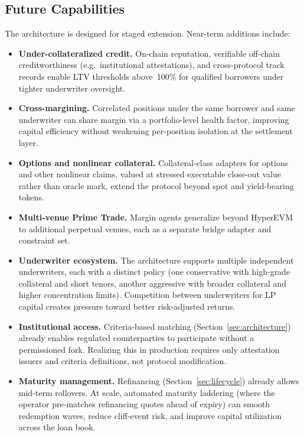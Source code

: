 \subsection{Future Capabilities}

The architecture is designed for staged extension. Near-term additions include:
\begin{itemize}
  \item \textbf{Under-collateralized credit.} On-chain reputation, verifiable off-chain creditworthiness (e.g.\ institutional attestations), and cross-protocol track records enable LTV thresholds above~100\% for qualified borrowers under tighter underwriter oversight.
  \item \textbf{Cross-margining.} Correlated positions under the same borrower and same underwriter can share margin via a portfolio-level health factor, improving capital efficiency without weakening per-position isolation at the settlement layer.
  \item \textbf{Options and nonlinear collateral.} Collateral-class adapters for options and other nonlinear claims, valued at stressed executable close-out value rather than oracle mark, extend the protocol beyond spot and yield-bearing tokens.
  \item \textbf{Multi-venue Prime Trade.} Margin agents generalize beyond HyperEVM to additional perpetual venues, each as a separate bridge adapter and constraint set.
  \item \textbf{Underwriter ecosystem.} The architecture supports multiple independent underwriters, each with a distinct policy (one conservative with high-grade collateral and short tenors, another aggressive with broader collateral and higher concentration limits). Competition between underwriters for LP capital creates pressure toward better risk-adjusted returns.
  \item \textbf{Institutional access.} Criteria-based matching (Section~\ref{sec:architecture}) already enables regulated counterparties to participate without a permissioned fork. Realizing this in production requires only attestation issuers and criteria definitions, not protocol modification.
  \item \textbf{Maturity management.} Refinancing (Section~\ref{sec:lifecycle}) already allows mid-term rollovers. At scale, automated maturity laddering (where the operator pre-matches refinancing quotes ahead of expiry) can smooth redemption waves, reduce cliff-event risk, and improve capital utilization across the loan book.
\end{itemize}

